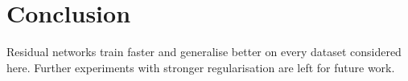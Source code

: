\documentclass[conference]{IEEEtran}
\begin{document}
\section{Conclusion}
Residual networks train faster and generalise better on every dataset considered here. Further
experiments with stronger regularisation are left for future work.
\end{document}
